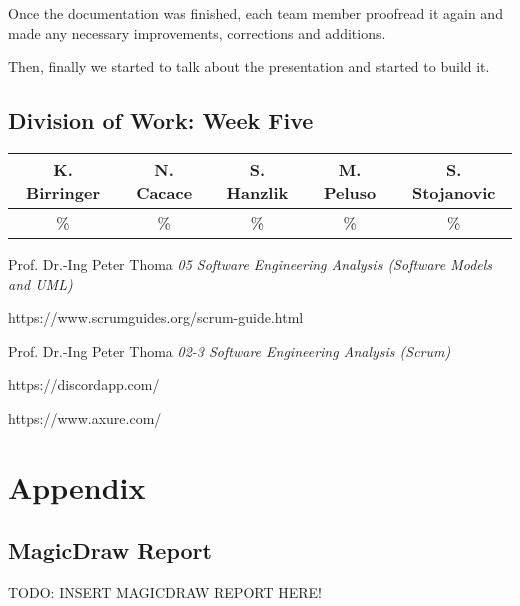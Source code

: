 \documentclass[a4paper, 12pt]{article}
\begin{document}
Once the documentation was finished, each team member proofread it again and made any necessary improvements, corrections and additions.

Then, finally we started to talk about the presentation and started to build it.

\subsection{Division of Work: Week Five}

\begin{table}[h]
\centering
\setlength{\tabcolsep}{10pt}
\begin{tabular}{|c|c|c|c|c|}
\hline
K. Birringer & N. Cacace & S. Hanzlik & M. Peluso & S. Stojanovic\\
\hline
\% & \% & \% & \% & \% \\ 
\hline
\end{tabular}
\end{table}

\newpage    
\begin{thebibliography}{}
Prof. Dr.-Ing Peter Thoma \emph{05 Software Engineering Analysis (Software Models and UML)}

https://www.scrumguides.org/scrum-guide.html

Prof. Dr.-Ing Peter Thoma \emph{02-3 Software Engineering Analysis (Scrum)}
 
https://discordapp.com/
 
https://www.axure.com/

\end{thebibliography}

\listoffigures

\newpage


\section{Appendix}

\subsection{MagicDraw Report}
\color{red}TODO: INSERT MAGICDRAW REPORT HERE!\color{black}
\end{document}
